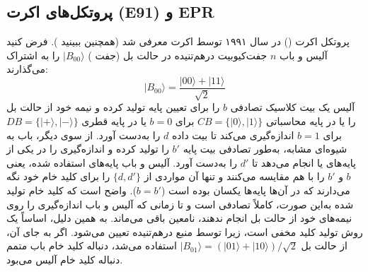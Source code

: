 \subsection{پروتکل‌های اکرت (E91) و EPR}
\label{subsec:7-3-3}
پروتکل اکرت () در سال ۱۹۹۱ توسط اکرت معرفی شد \cite{7-37} (همچنین ببینید \cite{7-6}). فرض کنید آلیس و باب $n$ جفت‌کیوبیت درهم‌تنیده در حالت بل (جفت ) $|B_{00}\rangle$ را به اشتراک می‌گذارند:
\begin{equation}
	|B_{00}\rangle = \frac{|00\rangle + |11\rangle}{\sqrt{2}}
	\label{eq:7-22}
\end{equation}
آلیس یک بیت کلاسیک تصادفی $b$ را برای تعیین پایه تولید کرده و نیمه خود از حالت بل را یا در پایه محاسباتی $CB = \{|0\rangle, |1\rangle\}$ برای $b=0$ یا در پایه قطری $DB = \{|+\rangle, |-\rangle\}$ برای $b=1$ اندازه‌گیری می‌کند تا بیت داده $d$ را به‌دست آورد. از سوی دیگر، باب به شیوه‌ای مشابه، به‌طور تصادفی بیت پایه $b'$ را تولید کرده و اندازه‌گیری را در یکی از پایه‌های  یا  انجام می‌دهد تا $d'$ را به‌دست آورد. آلیس و باب پایه‌های استفاده شده، یعنی $b$ و $b'$ را با هم مقایسه می‌کنند و تنها آن مواردی از $\{d, d'\}$ را برای کلید خام خود نگه می‌دارند که در آن‌ها پایه‌ها یکسان بوده است ($b=b'$). واضح است که کلید خام تولید شده به‌این صورت، کاملاً تصادفی است و تا زمانی که آلیس و باب اندازه‌گیری را روی نیمه‌های خود از حالت بل انجام ندهند، نامعین باقی می‌ماند. به همین دلیل،  اساساً یک روش تولید کلید مخفی است، زیرا توسط منبع درهم‌تنیده تعیین می‌شود. اگر به جای آن، از حالت بل $|B_{01}\rangle = (|01\rangle + |10\rangle)/\sqrt{2}$ استفاده می‌شد، دنباله کلید خام باب متمم دنباله کلید خام آلیس می‌بود.

